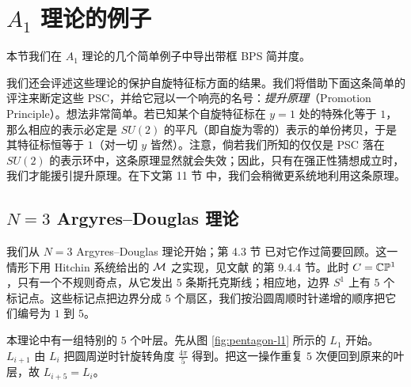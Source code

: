 
\section{$A_1$ 理论的例子}\label{sec:Examples}

本节我们在 $A_1$ 理论的几个简单例子中导出带框 BPS 简并度。

我们还会评述这些理论的保护自旋特征标方面的结果。我们将借助下面这条简单的评注来断定这些 PSC，并给它冠以一个响亮的名号：\emph{提升原理}（Promotion Principle）。想法非常简单。若已知某个自旋特征标在 $y=1$ 处的特殊化等于 $1$，那么相应的表示必定是 $SU(2)$ 的平凡（即自旋为零的）表示的单份拷贝，于是其特征标恒等于 $1$（对一切 $y$ 皆然）。注意，倘若我们所知的仅仅是 PSC 落在 $SU(2)$ 的表示环中，这条原理显然就会失效；因此，只有在强正性猜想成立时，我们才能援引提升原理。在下文第 11 节%
中，我们会稍微更系统地利用这条原理。

\subsection{$N=3$ Argyres--Douglas 理论}\label{subsec:ADN3-Laminations}

我们从 $N=3$ Argyres--Douglas 理论开始；第 4.3 节%
已对它作过简要回顾。这一情形下用 Hitchin 系统给出的 $\mathcal{M}$ 之实现，见文献 \cite{Gaiotto:2009hg} 的第 9.4.4 节。此时 $C = \mathbb{C}\mathbb{P}^1$，只有一个不规则奇点，从它发出 $5$ 条斯托克斯线；相应地，边界 $S^1$ 上有 $5$ 个标记点。这些标记点把边界分成 $5$ 个扇区，我们按沿圆周顺时针递增的顺序把它们编号为 $1$ 到 $5$。

本理论中有一组特别的 $5$ 个叶层。先从图 \ref{fig:pentagon-l1} 所示的 $L_1$ 开始。
$L_{i+1}$ 由 $L_i$ 把圆周逆时针旋转角度 $\frac{4 \pi}{5}$ 得到。把这一操作重复 $5$ 次便回到原来的叶层，故 $L_{i+5} = L_i$。

